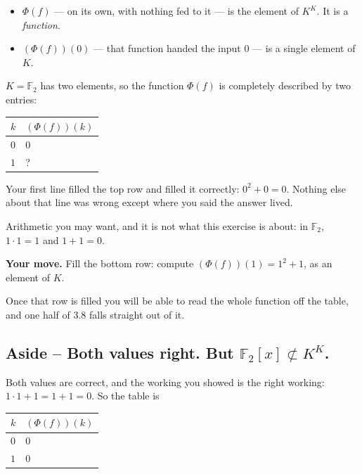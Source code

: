 \documentclass[11pt]{article}
\begin{document}
\begin{itemize}
  \item $\Phi(f)$ --- on its own, with nothing fed to it --- is the element of $K^K$. It is a \emph{function}.
  \item $(\Phi(f))(0)$ --- that function handed the input $0$ --- is a single element of $K$.
\end{itemize}

$K = \mathbb{F}_2$ has two elements, so the function $\Phi(f)$ is completely described by two entries:

\begin{center}\begin{tabular}{ll}\hline
\textbf{$k$} & \textbf{$(\Phi(f))(k)$} \\ \hline
$0$ & $0$ \\
$1$ & ? \\
\hline\end{tabular}\end{center}

Your first line filled the top row and filled it correctly: $0^2 + 0 = 0$. Nothing else about that line was wrong except where you said the answer lived.

Arithmetic you may want, and it is not what this exercise is about: in $\mathbb{F}_2$, $1 \cdot 1 = 1$ and $1 + 1 = 0$.

\textbf{Your move.} Fill the bottom row: compute $(\Phi(f))(1) = 1^2 + 1$, as an element of $K$.

Once that row is filled you will be able to read the whole function off the table, and one half of 3.8 falls straight out of it.


\subsection*{Aside -- Both values right. But $\mathbb{F}_2[x] \not\subset K^K$.}
Both values are correct, and the working you showed is the right working: $1 \cdot 1 + 1 = 1 + 1 = 0$. So the table is

\begin{center}\begin{tabular}{ll}\hline
\textbf{$k$} & \textbf{$(\Phi(f))(k)$} \\ \hline
$0$ & $0$ \\
$1$ & $0$ \\
\hline\end{tabular}\end{center}
\end{document}
